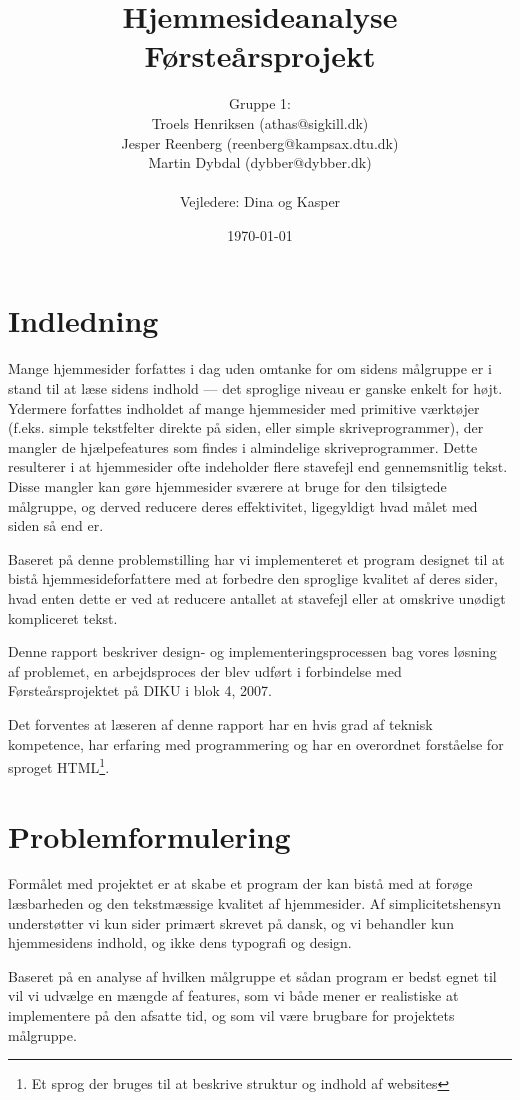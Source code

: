 \documentclass[a4paper,oneside,article]{memoir}
\title{Hjemmesideanalyse  \\ \small{Førsteårsprojekt}}
\author
{
  Gruppe 1:\\
  Troels Henriksen (athas@sigkill.dk)\\
  Jesper Reenberg (reenberg@kampsax.dtu.dk)\\
  Martin Dybdal (dybber@dybber.dk)\\ \\
  Vejledere: Dina og Kasper
}
\date{\today}
\begin{document}
\maketitle
\newpage
\tableofcontents*
\newpage

\chapter{Indledning}
\label{indledning}
Mange hjemmesider forfattes i dag uden omtanke for om sidens målgruppe
er i stand til at læse sidens indhold --- det sproglige niveau er
ganske enkelt for højt. Ydermere forfattes indholdet af mange
hjemmesider med primitive værktøjer (f.eks. simple tekstfelter direkte
på siden, eller simple skriveprogrammer), der mangler de
hjælpefeatures som findes i almindelige skriveprogrammer. Dette
resulterer i at hjemmesider ofte indeholder flere stavefejl end
gennemsnitlig tekst. Disse mangler kan gøre hjemmesider sværere at
bruge for den tilsigtede målgruppe, og derved reducere deres
effektivitet, ligegyldigt hvad målet med siden så end er.

Baseret på denne problemstilling har vi implementeret et program
designet til at bistå hjemmesideforfattere med at forbedre den
sproglige kvalitet af deres sider, hvad enten dette er ved at reducere
antallet at stavefejl eller at omskrive unødigt kompliceret tekst.

Denne rapport beskriver design- og implementeringsprocessen bag vores
løsning af problemet, en arbejdsproces der blev udført i forbindelse
med Førsteårsprojektet på DIKU i blok 4, 2007.

Det forventes at læseren af denne rapport har en hvis grad af teknisk
kompetence, har erfaring med programmering og har en overordnet
forståelse for sproget HTML\footnote{Et sprog der bruges til at
  beskrive struktur og indhold af websites}.

\chapter{Problemformulering}

Formålet med projektet er at skabe et program der kan bistå med at
forøge læsbarheden og den tekstmæssige kvalitet af hjemmesider. Af
simplicitetshensyn understøtter vi kun sider primært skrevet på dansk,
og vi behandler kun hjemmesidens indhold, og ikke dens typografi og
design.

Baseret på en analyse af hvilken målgruppe et sådan program er bedst
egnet til vil vi udvælge en mængde af features, som vi både mener er
realistiske at implementere på den afsatte tid, og som vil være
brugbare for projektets målgruppe.
\end{document}
